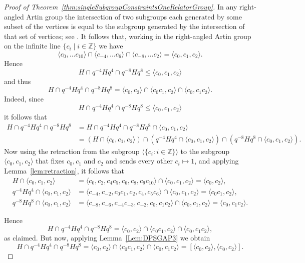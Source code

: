 \documentclass[11pt]{amsart}
\theoremstyle{definition}
\numberwithin{theorem}{section}
\newcommand{\Z}{\mathbb{Z}}
\begin{document}
\begin{proof}[Proof of Theorem~\ref{thm:singleSubgroupConstraintsOneRelatorGroup}]
In any right-angled Artin group the intersection of two subgroups each
generated by some subset of the vertices is equal to the subgroup generated by
the intersection of that set of vertices; see
\cite[Lemma~3.1]{AntolinFoniqi22}. It follows that, working in the right-angled
Artin group on the infinite line $\{c_i \mid i \in \mathbb{Z} \}$ we have 
\[
\langle c_0, \ldots c_{10} \rangle \cap 
\langle c_{-4}, \ldots c_6 \rangle \cap 
\langle c_{-8}, \ldots c_2 \rangle 
= 
\langle c_0,c_1,c_2 \rangle. 
\]
Hence 
\[
H \cap q^{-4}Hq^4 \cap q^{-8}Hq^8 \leq \langle c_0,c_1,c_2 \rangle
\]
and thus 
\[
H \cap q^{-4}Hq^4 \cap q^{-8}Hq^8 = 
\langle c_0, c_2 \rangle \cap 
\langle c_0c_1, c_2 \rangle \cap 
\langle c_0, c_1c_2 \rangle.  
\]
Indeed, since  
\[
H \cap q^{-4}Hq^4 \cap q^{-8}Hq^8 \leq \langle c_0,c_1,c_2 \rangle
\]
it follows that 
\begin{align*} 
H \cap q^{-4}Hq^4 \cap q^{-8}Hq^8 & = 
H \cap q^{-4}Hq^4 \cap q^{-8}Hq^8 \cap \langle c_0,c_1,c_2 \rangle \\ 
& = 
(H \cap \langle c_0,c_1,c_2 \rangle) \cap 
(q^{-4}Hq^4  \cap \langle c_0,c_1,c_2 \rangle) \cap 
(q^{-8}Hq^8 \cap \langle c_0,c_1,c_2 \rangle). 
  \end{align*}
Now using the retraction from the subgroup $\langle \{ c_i: i \in \Z \} \rangle$ to the subgroup $\langle c_0, c_1, c_2 \rangle$ that fixes $c_0, c_1$ and $c_2$ and  sends every other $c_i \mapsto 1$, and applying Lemma~\ref{lem:retraction}, it follows that
\begin{align*} 
H  \cap \langle c_0,c_1,c_2 \rangle &= 
\langle 
c_0, c_2, 
c_4c_5, c_6, 
c_8, c_9c_{10}
\rangle
\cap \langle c_0,c_1,c_2 \rangle = \langle c_0, c_2 \rangle, \\
q^{-4}Hq^4  \cap \langle c_0,c_1,c_2 \rangle
& = 
\langle 
c_{-4}, c_{-2}, 
c_0c_1, c_2, 
c_4, c_5c_{6}
\rangle 
 \cap \langle c_0,c_1,c_2 \rangle = \langle c_0c_1, c_2 \rangle,  \\
q^{-8}Hq^8 \cap \langle c_0,c_1,c_2 \rangle
& = 
\langle 
c_{-8}, c_{-6}, 
c_{-4}c_{-3}, c_{-2}, 
c_0, c_1c_{2}
\rangle 
 \cap \langle c_0,c_1,c_2 \rangle = \langle c_0, c_1c_2 \rangle. 
\end{align*}

Hence 
\[
H \cap q^{-4}Hq^4 \cap q^{-8}Hq^8 = 
\langle c_0, c_2 \rangle \cap 
\langle c_0c_1, c_2 \rangle \cap 
\langle c_0, c_1c_2 \rangle,  
\]
as claimed.
But now, applying Lemma~\ref{Lem:DPSGAP3} we obtain 
\[
H \cap q^{-4}Hq^4 \cap q^{-8}Hq^8 = 
\langle c_0, c_2 \rangle \cap 
\langle c_0c_1, c_2 \rangle \cap 
\langle c_0, c_1c_2 \rangle = 
[\langle c_0, c_2 \rangle, \langle c_0, c_2 \rangle]. 
\]


\end{proof}
\end{document}
